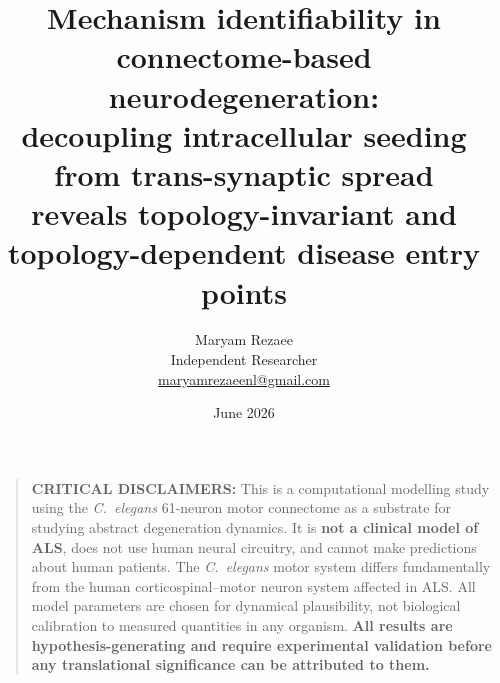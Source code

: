 \documentclass[12pt,a4paper]{article}
\title{Mechanism identifiability in connectome-based neurodegeneration:\\
decoupling intracellular seeding from trans-synaptic spread\\
reveals topology-invariant and topology-dependent disease entry points}
\author{Maryam Rezaee\\
\small Independent Researcher\\
\small \href{mailto:maryamrezaeenl@gmail.com}{maryamrezaeenl@gmail.com}}
\date{June 2026}
\begin{document}
\maketitle

\begin{quote}
\textbf{CRITICAL DISCLAIMERS:} This is a computational modelling study using the
\textit{C.~elegans} 61-neuron motor connectome as a substrate for studying abstract
degeneration dynamics. It is \textbf{not a clinical model of ALS}, does not use human neural
circuitry, and cannot make predictions about human patients. The \textit{C.~elegans} motor
system differs fundamentally from the human corticospinal--motor neuron system affected in ALS.
All model parameters are chosen for dynamical plausibility, not biological calibration to
measured quantities in any organism. \textbf{All results are hypothesis-generating and require
experimental validation before any translational significance can be attributed to them.}
\end{quote}
\end{document}
